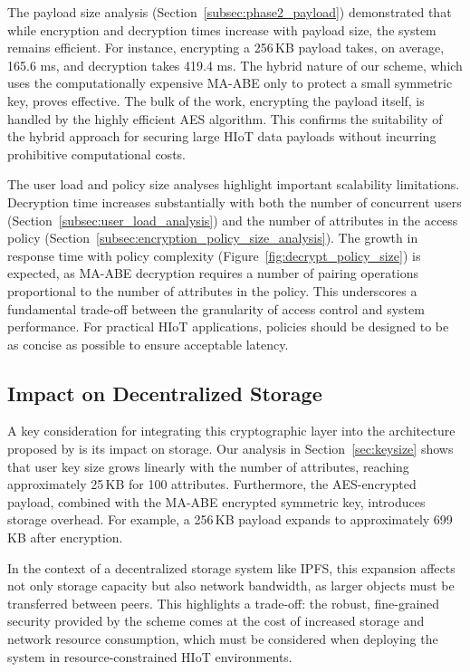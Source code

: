 \documentclass[cic,tc,english]{iiufrgs}
\numberwithin{algorithm}{chapter}
\begin{document}
                The payload size analysis (Section~\ref{subsec:phase2_payload}) demonstrated that while encryption and decryption times increase with payload size, the system remains efficient. For instance, encrypting a 256\,KB payload takes, on average, 165.6 ms, and decryption takes 419.4 ms. The hybrid nature of our scheme, which uses the computationally expensive MA-ABE only to protect a small symmetric key, proves effective. The bulk of the work, encrypting the payload itself, is handled by the highly efficient AES algorithm. This confirms the suitability of the hybrid approach for securing large HIoT data payloads without incurring prohibitive computational costs.

                The user load and policy size analyses highlight important scalability limitations. Decryption time increases substantially with both the number of concurrent users (Section~\ref{subsec:user_load_analysis}) and the number of attributes in the access policy (Section~\ref{subsec:encryption_policy_size_analysis}). The growth in response time with policy complexity (Figure~\ref{fig:decrypt_policy_size}) is expected, as MA-ABE decryption requires a number of pairing operations proportional to the number of attributes in the policy. This underscores a fundamental trade-off between the granularity of access control and system performance. For practical HIoT applications, policies should be designed to be as concise as possible to ensure acceptable latency.

            \subsection{Impact on Decentralized Storage}

                A key consideration for integrating this cryptographic layer into the architecture proposed by \citet{laura2023} is its impact on storage. Our analysis in Section~\ref{sec:keysize} shows that user key size grows linearly with the number of attributes, reaching approximately 25\,KB for 100 attributes. Furthermore, the AES-encrypted payload, combined with the MA-ABE encrypted symmetric key, introduces storage overhead. For example, a 256\,KB payload expands to approximately 699\,KB after encryption.

                In the context of a decentralized storage system like IPFS, this expansion affects not only storage capacity but also network bandwidth, as larger objects must be transferred between peers. This highlights a trade-off: the robust, fine-grained security provided by the scheme comes at the cost of increased storage and network resource consumption, which must be considered when deploying the system in resource-constrained HIoT environments.
\end{document}
